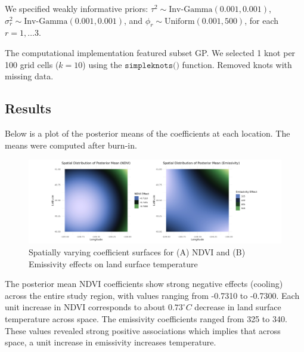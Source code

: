 We specified weakly informative priors: $\tau^2 \sim \text{Inv-Gamma}(0.001, 0.001)$, \newline $\sigma_r^2 \sim \text{Inv-Gamma}(0.001, 0.001)$, and $\phi_r \sim \text{Uniform}(0.001, 500)$, for each $r = 1, \dots 3$.

The computational implementation featured subset GP. We selected 1 knot per 100 grid cells ($k=10$) using the  $\texttt{simpleknots()}$ function. Removed knots with missing data.
\subsection{Results}
% 
% 
Below is a plot of the posterior means of the coefficients at each location. The means were computed after burn-in.
\begin{figure}[H]
 \centering
 \includegraphics[width=\textwidth]{../../figures/model_means.png}
 \caption{Spatially varying coefficient surfaces for (A) NDVI and (B) Emissivity effects on land surface temperature}
 \label{fig:posterior means}
 \end{figure}
 The posterior mean NDVI coefficients show strong negative effects (cooling) across the entire study region, with values ranging from -0.7310 to -0.7300. 
 Each unit increase in NDVI corresponds to about $0.73^\circ C$ decrease in land surface temperature across space.
 The emissivity coefficients ranged from 325 to 340. These values revealed strong positive associations  which implies that across space, a unit increase in emissivity increases temperature.
 
